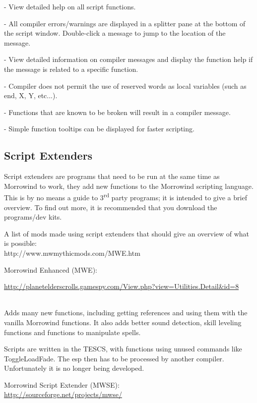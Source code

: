 \documentclass[
]{article}
\begin{document}
- View detailed help on all script functions.

- All compiler errors/warnings are displayed in a splitter pane at the
bottom of the script window. Double-click a message to jump to the
location of the message.

- View detailed information on compiler messages and display the
function help if the message is related to a specific function.

- Compiler does not permit the use of reserved words as local variables
(such as end, X, Y, etc...).

- Functions that are known to be broken will result in a compiler
message.

- Simple function tooltips can be displayed for faster scripting.

\hypertarget{script-extenders}{%
\subsection{Script Extenders}\label{script-extenders}}

Script extenders are programs that need to be run at the same time as
Morrowind to work, they add new functions to the Morrowind scripting
language.\\
This is by no means a guide to 3\textsuperscript{rd} party programs; it
is intended to give a brief overview. To find out more, it is
recommended that you download the programs/dev kits.

A list of mods made using script extenders that should give an overview
of what is possible:\\
http://www.mwmythicmods.com/MWE.htm

Morrowind Enhanced (MWE):

\url{http://planetelderscrolls.gamespy.com/View.php?view=Utilities.Detail\&id=8}\strut \\
Adds many new functions, including getting references and using them
with the vanilla Morrowind functions. It also adds better sound
detection, skill leveling functions and functions to manipulate spells.

Scripts are written in the TESCS, with functions using unused commands
like ToggleLoadFade. The esp then has to be processed by another
compiler.\\
Unfortunately it is no longer being developed.

Morrowind Script Extender (MWSE):\\
\url{http://sourceforge.net/projects/mwse/}
\end{document}
